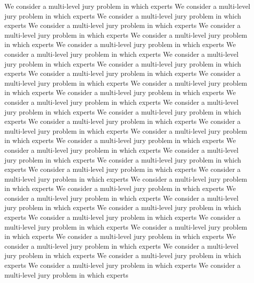 \documentclass[letterpaper]{article} %
\begin{document}
We consider a multi-level jury problem in which experts
We consider a multi-level jury problem in which experts
We consider a multi-level jury problem in which experts
We consider a multi-level jury problem in which experts
We consider a multi-level jury problem in which experts
We consider a multi-level jury problem in which experts
We consider a multi-level jury problem in which experts
We consider a multi-level jury problem in which experts
We consider a multi-level jury problem in which experts
We consider a multi-level jury problem in which experts
We consider a multi-level jury problem in which experts
We consider a multi-level jury problem in which experts
We consider a multi-level jury problem in which experts
We consider a multi-level jury problem in which experts
We consider a multi-level jury problem in which experts
We consider a multi-level jury problem in which experts
We consider a multi-level jury problem in which experts
We consider a multi-level jury problem in which experts
We consider a multi-level jury problem in which experts
We consider a multi-level jury problem in which experts
We consider a multi-level jury problem in which experts
We consider a multi-level jury problem in which experts
We consider a multi-level jury problem in which experts
We consider a multi-level jury problem in which experts
We consider a multi-level jury problem in which experts
We consider a multi-level jury problem in which experts
We consider a multi-level jury problem in which experts
We consider a multi-level jury problem in which experts
We consider a multi-level jury problem in which experts
We consider a multi-level jury problem in which experts
We consider a multi-level jury problem in which experts
We consider a multi-level jury problem in which experts
We consider a multi-level jury problem in which experts
We consider a multi-level jury problem in which experts
We consider a multi-level jury problem in which experts
We consider a multi-level jury problem in which experts
We consider a multi-level jury problem in which experts
We consider a multi-level jury problem in which experts
We consider a multi-level jury problem in which experts
We consider a multi-level jury problem in which experts
\clearpage

\end{document}
